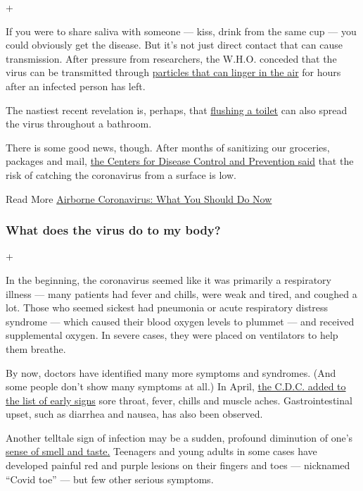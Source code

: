 +

If you were to share saliva with someone --- kiss, drink from the same
cup --- you could obviously get the disease. But it's not just direct
contact that can cause transmission. After pressure from researchers,
the W.H.O. conceded that the virus can be transmitted through
\href{https://www.nytimes3xbfgragh.onion/2020/07/09/health/virus-aerosols-who.html}{particles
that can linger in the air} for hours after an infected person has left.

The nastiest recent revelation is, perhaps, that
\href{https://www.nytimes3xbfgragh.onion/2020/06/16/health/coronavirus-toilets-flushing.html}{flushing
a toilet} can also spread the virus throughout a bathroom.

There is some good news, though. After months of sanitizing our
groceries, packages and mail,
\href{https://www.nytimes3xbfgragh.onion/2020/05/22/health/cdc-coronavirus-touching-surfaces.html}{the
Centers for Disease Control and Prevention said} that the risk of
catching the coronavirus from a surface is low.

 Read More
\href{https://www.nytimes3xbfgragh.onion/2020/07/06/health/coronavirus-airborne-aerosols.html}{Airborne
Coronavirus: What You Should Do Now}

\hypertarget{what-does-the-virus-do-to-my-body}{%
\subsubsection{What does the virus do to my
body?}\label{what-does-the-virus-do-to-my-body}}

+

In the beginning, the coronavirus seemed like it was primarily a
respiratory illness --- many patients had fever and chills, were weak
and tired, and coughed a lot. Those who seemed sickest had pneumonia or
acute respiratory distress syndrome --- which caused their blood oxygen
levels to plummet --- and received supplemental oxygen. In severe cases,
they were placed on ventilators to help them breathe.

By now, doctors have identified many more symptoms and syndromes. (And
some people don't show many symptoms at all.) In April,
\href{https://www.nytimes3xbfgragh.onion/2020/04/27/health/coronavirus-symptoms-cdc.html}{the
C.D.C. added to the list of early signs} sore throat, fever, chills and
muscle aches. Gastrointestinal upset, such as diarrhea and nausea, has
also been observed.

Another telltale sign of infection may be a sudden, profound diminution
of one's
\href{https://www.nytimes3xbfgragh.onion/2020/03/22/health/coronavirus-symptoms-smell-taste.html}{sense
of smell and taste.} Teenagers and young adults in some cases have
developed painful red and purple lesions on their fingers and toes ---
nicknamed ``Covid toe'' --- but few other serious symptoms.

